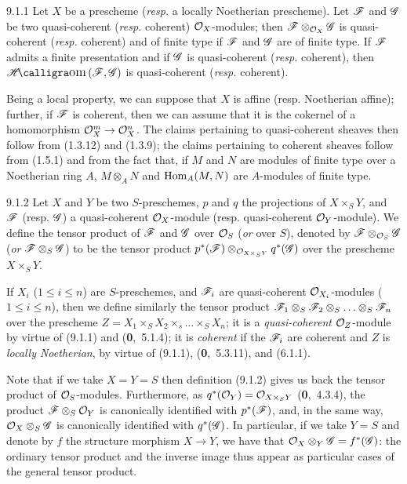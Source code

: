 \documentclass[../main.tex]{subfiles}
\begin{document}
\begin{cx}[Proposition]{9.1.1}
    Let $X$ be a prescheme (\emph{resp.} a locally Noetherian prescheme).
    Let $\mathscr{F}$ and $\mathscr{G}$ be two quasi-coherent (\emph{resp.} coherent) $\mathcal{O}_X$-modules; then $\mathscr{F}\otimes_{\mathcal{O}_X}\mathscr{G}$ is quasi-coherent (\emph{resp.} coherent) and of finite type if $\mathscr{F}$ and $\mathscr{G}$ are of finite type.
    If $\mathscr{F}$ admits a finite presentation and if $\mathscr{G}$ is quasi-coherent (\emph{resp.} coherent), then $\sheafHom(\scr{F},\scr{G})$ is quasi-coherent (\emph{resp.} coherent).
\end{cx}

Being a local property, we can suppose that $X$ is affine (resp. Noetherian affine); further, if $\mathscr{F}$ is coherent, then we can assume that it is the cokernel of a homomorphism $\mathcal{O}_X^m\to\mathcal{O}_X^n$.
The claims pertaining to quasi-coherent sheaves then follow from (1.3.12) and (1.3.9); the claims pertaining to coherent sheaves follow from (1.5.1) and from the fact that, if $M$ and $N$ are modules of finite type over a Noetherian ring $A$, $M\otimes_A N$ and $\operatorname*{Hom}_A(M,N)$ are $A$-modules of finite type.

\begin{cx}[Definition]{9.1.2}
    Let $X$ and $Y$ be two $S$-preschemes, $p$ and $q$ the projections of $X\times_S Y$, and $\mathscr{F}$ (resp. $\mathscr{G}$) a quasi-coherent $\mathcal{O}_X$-module (resp. quasi-coherent $\mathcal{O}_Y$-module).
    We define the tensor product of $\mathscr{F}$ and $\mathscr{G}$ over $\mathcal{O}_S$ (\emph{or} over $S$), denoted by $\mathscr{F}\otimes_{\mathcal{O}_S}\mathscr{G}$ (\emph{or} $\mathscr{F}\otimes_S\mathscr{G}$) to be the tensor product $p^*(\mathscr{F})\otimes_{\mathcal{O}_{X\times_S Y}}q^*(\mathscr{G})$ over the prescheme $X\times_S Y$.
\end{cx}


If $X_i$ ($1\leqslant i\leqslant n$) are $S$-preschemes, and $\mathscr{F}_i$ are quasi-coherent $\mathcal{O}_{X_i}$-modules ($1\leqslant i\leqslant n$), then we define similarly the tensor product $\mathscr{F}_1\otimes_S\mathscr{F}_2\otimes_S\ldots\otimes_S\mathscr{F}_n$ over the prescheme $Z=X_1\times_S X_2\times_s\ldots\times_S X_n$; it is a \emph{quasi-coherent} $\mathcal{O}_Z$-module by virtue of (9.1.1) and (\textbf{0},~5.1.4); it is \emph{coherent} if the $\mathscr{F}_i$ are coherent and $Z$ is \emph{locally Noetherian}, by virtue of (9.1.1), (\textbf{0},~5.3.11), and (6.1.1).

Note that if we take $X=Y=S$ then definition (9.1.2) gives us back the tensor product of $\mathcal{O}_S$-modules.
Furthermore, as $q^*(\mathcal{O}_Y)=\mathcal{O}_{X\times_S Y}$ (\textbf{0},~4.3.4), the product $\mathscr{F}\otimes_S\mathcal{O}_Y$ is canonically identified with $p^*(\mathscr{F})$, and, in the same way, $\mathcal{O}_X\otimes_S\mathscr{G}$ is canonically identified with $q^*(\mathscr{G})$.
In particular, if we take $Y=S$ and denote by $f$ the structure morphism $X\to Y$, we have that $\mathcal{O}_X\otimes_Y\mathscr{G}=f^*(\mathscr{G})$: the ordinary tensor product and the inverse image thus appear as particular cases of the general tensor product.
\end{document}
